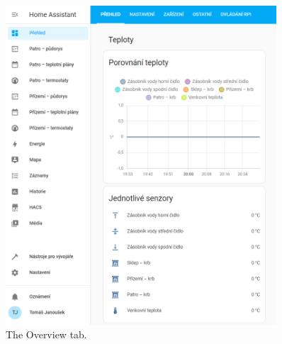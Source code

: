 \begin{English}
\begin{figure}[H]
    \centering
    \includegraphics[width=0.9\textwidth]{pictures/czech/software/overview-tab.png}
    \caption{The Overview tab.}
    \label{fig:overview-tab}
\end{figure}
\end{English}

